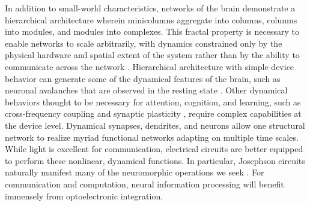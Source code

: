 \documentclass[twocolumn]{article}
\begin{document}
In addition to small-world characteristics, networks of the brain demonstrate a hierarchical architecture wherein minicolumns aggregate into columns, columns into modules, and modules into complexes. This fractal property is necessary to enable networks to scale arbitrarily, with dynamics constrained only by the physical hardware and spatial extent of the system rather than by the ability to communicate across the network \cite{plth2006}.  Hierarchical architecture with simple device behavior can generate some of the dynamical features of the brain, such as neuronal avalanches \cite{plth2006} that are observed in the resting state \cite{peth2009}. Other dynamical behaviors thought to be necessary for attention, cognition, and learning, such as cross-frequency coupling \cite{bu2006} and synaptic plasticity \cite{mage2012,ab2008,fudr2005}, require complex capabilities at the device level. Dynamical synapses, dendrites, and neurons allow one structural network to realize myriad functional networks adapting on multiple time scales. While light is excellent for communication, electrical circuits are better equipped to perform these nonlinear, dynamical functions. In particular, Josephson circuits naturally manifest many of the neuromorphic operations we seek \cite{sh2018,sh2019_fluxonic}. For communication and computation, neural information processing will benefit immensely from optoelectronic integration.
\begin{figure}[tb]
\end{figure}
\end{document}

